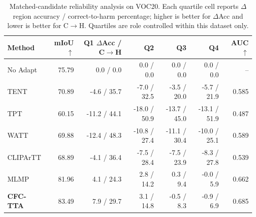 \begin{table}[t]
\centering
\scriptsize
\setlength{\tabcolsep}{3.2pt}
\caption{Matched-candidate reliability analysis on VOC20. Each quartile cell reports $\Delta$ region accuracy / correct-to-harm percentage; higher is better for $\Delta$Acc and lower is better for C$\rightarrow$H. Quartiles are role controlled within this dataset only.}
\label{tab:source-risk-voc20}
\begin{tabular}{lrrrrrr}
\toprule
Method & mIoU $\uparrow$ & Q1 $\Delta$Acc / C$\rightarrow$H & Q2 & Q3 & Q4 & AUC $\uparrow$ \\
\midrule
No Adapt & 75.79 & 0.0 / 0.0 & 0.0 / 0.0 & 0.0 / 0.0 & 0.0 / 0.0 & -- \\
TENT & 70.89 & -4.6 / 35.7 & -7.0 / 32.5 & -3.5 / 20.0 & -5.7 / 21.9 & 0.585 \\
TPT & 60.15 & -11.2 / 44.1 & -18.0 / 50.9 & -13.7 / 45.0 & -13.1 / 51.9 & 0.487 \\
WATT & 69.88 & -12.4 / 48.3 & -10.8 / 27.4 & -11.1 / 30.4 & -10.0 / 25.1 & 0.589 \\
CLIPArTT & 68.89 & -4.1 / 36.4 & -7.5 / 28.4 & -7.5 / 23.9 & -8.3 / 27.8 & 0.539 \\
MLMP & 81.96 & 4.1 / 24.3 & 2.8 / 14.2 & 0.3 / 9.4 & -0.0 / 5.9 & 0.662 \\
\textbf{CFC-TTA} & 83.49 & 7.9 / 29.7 & 3.1 / 14.8 & -0.5 / 8.3 & -0.9 / 6.9 & 0.685 \\
\bottomrule
\end{tabular}
\end{table}
